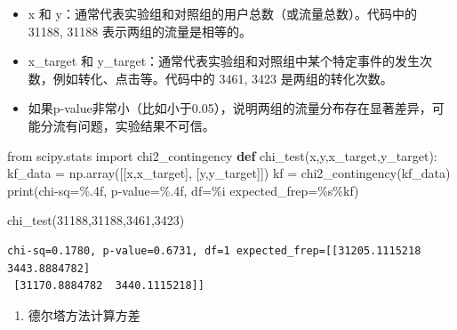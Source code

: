 \documentclass[
  letterpaper,
  DIV=11,
  numbers=noendperiod]{scrreprt}
\newenvironment{Shaded}{\begin{snugshade}}{\end{snugshade}}
\newcommand{\BuiltInTok}[1]{\textcolor[rgb]{0.00,0.23,0.31}{#1}}
\newcommand{\DecValTok}[1]{\textcolor[rgb]{0.68,0.00,0.00}{#1}}
\newcommand{\ImportTok}[1]{\textcolor[rgb]{0.00,0.46,0.62}{#1}}
\newcommand{\KeywordTok}[1]{\textcolor[rgb]{0.00,0.23,0.31}{\textbf{#1}}}
\newcommand{\NormalTok}[1]{\textcolor[rgb]{0.00,0.23,0.31}{#1}}
\newcommand{\OperatorTok}[1]{\textcolor[rgb]{0.37,0.37,0.37}{#1}}
\newcommand{\SpecialCharTok}[1]{\textcolor[rgb]{0.37,0.37,0.37}{#1}}
\newcommand{\StringTok}[1]{\textcolor[rgb]{0.13,0.47,0.30}{#1}}
\providecommand{\tightlist}{%
  \setlength{\itemsep}{0pt}\setlength{\parskip}{0pt}}
\begin{document}
\begin{itemize}
\item
  x 和 y：通常代表实验组和对照组的用户总数（或流量总数）。代码中的
  31188, 31188 表示两组的流量是相等的。
\item
  x\_target 和
  y\_target：通常代表实验组和对照组中某个特定事件的发生次数，例如转化、点击等。代码中的
  3461, 3423 是两组的转化次数。
\item
  如果p-value非常小（比如小于0.05），说明两组的流量分布存在显著差异，可能分流有问题，实验结果不可信。
\end{itemize}

\begin{Shaded}
\begin{Highlighting}[]
\ImportTok{from}\NormalTok{ scipy.stats }\ImportTok{import}\NormalTok{ chi2\_contingency}
\KeywordTok{def}\NormalTok{ chi\_test(x,y,x\_target,y\_target):}
\NormalTok{    kf\_data }\OperatorTok{=}\NormalTok{ np.array([[x,x\_target], [y,y\_target]])}
\NormalTok{    kf }\OperatorTok{=}\NormalTok{ chi2\_contingency(kf\_data)}
    \BuiltInTok{print}\NormalTok{(}\StringTok{\textquotesingle{}chi{-}sq=}\SpecialCharTok{\%.4f}\StringTok{, p{-}value=}\SpecialCharTok{\%.4f}\StringTok{, df=}\SpecialCharTok{\%i}\StringTok{ expected\_frep=}\SpecialCharTok{\%s}\StringTok{\textquotesingle{}}\OperatorTok{\%}\NormalTok{kf)}

\NormalTok{chi\_test(}\DecValTok{31188}\NormalTok{,}\DecValTok{31188}\NormalTok{,}\DecValTok{3461}\NormalTok{,}\DecValTok{3423}\NormalTok{)}
\end{Highlighting}
\end{Shaded}

\begin{verbatim}
chi-sq=0.1780, p-value=0.6731, df=1 expected_frep=[[31205.1115218  3443.8884782]
 [31170.8884782  3440.1115218]]
\end{verbatim}

\begin{enumerate}
\def\labelenumi{\arabic{enumi}.}
\setcounter{enumi}{1}
\tightlist
\item
  德尔塔方法计算方差
\end{enumerate}
\end{document}
